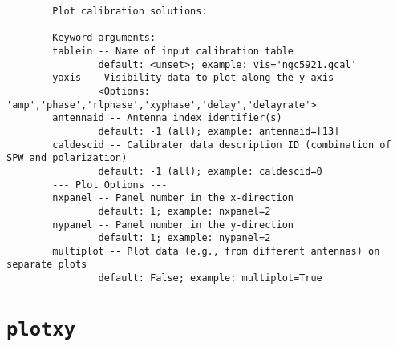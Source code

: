 \small
\begin{verbatim}
        Plot calibration solutions: 
        
        Keyword arguments:
        tablein -- Name of input calibration table 
                default: <unset>; example: vis='ngc5921.gcal'
        yaxis -- Visibility data to plot along the y-axis
                <Options: 'amp','phase','rlphase','xyphase','delay','delayrate'>
        antennaid -- Antenna index identifier(s)
                default: -1 (all); example: antennaid=[13]
        caldescid -- Calibrater data description ID (combination of SPW and polarization)
                default: -1 (all); example: caldescid=0
        --- Plot Options ---
        nxpanel -- Panel number in the x-direction
                default: 1; example: nxpanel=2
        nypanel -- Panel number in the y-direction 
                default: 1; example: nypanel=2
        multiplot -- Plot data (e.g., from different antennas) on separate plots
                default: False; example: multiplot=True
\end{verbatim}
\normalsize


\section{{\tt plotxy}}
\label{section:tasks.plotxy}

